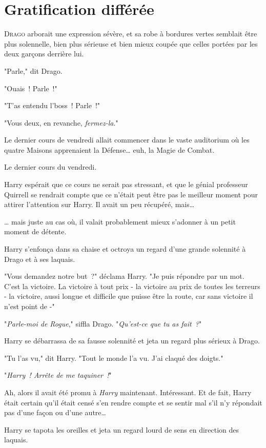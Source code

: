 \chapter{Gratification différée}

\lettrine{D}{rago} arborait une expression sévère, et sa robe à bordures vertes semblait être plus solennelle, bien plus sérieuse et bien mieux coupée que celles portées par les deux garçons derrière lui.

"Parle," dit Drago.

"Ouais~! Parle~!"

"T'as entendu l'boss~! Parle~!"

"Vous deux, en revanche, \emph{fermez-la}."

Le dernier cours de vendredi allait commencer dans le vaste auditorium où les quatre Maisons apprenaient la Défense… euh, la Magie de Combat.

Le dernier cours du vendredi.

Harry espérait que ce cours ne serait pas stressant, et que le génial professeur Quirrell se rendrait compte que ce n'était peut être pas le meilleur moment pour attirer l'attention sur Harry. Il avait un peu récupéré, mais…

… mais juste au cas où, il valait probablement mieux s'adonner à un petit moment de détente.

Harry s'enfonça dans sa chaise et octroya un regard d'une grande solennité à Drago et à ses laquais.

"Vous demandez notre but~?" déclama Harry. "Je puis répondre par un mot. C'est la victoire. La victoire à tout prix - la victoire au prix de toutes les terreurs - la victoire, aussi longue et difficile que puisse être la route, car sans victoire il n'est point de -"

"\emph{Parle-moi de Rogue}," siffla Drago. "\emph{Qu'est-ce que tu as fait~?}"

Harry se débarrassa de sa fausse solennité et jeta un regard plus sérieux à Drago.

"Tu l'as vu," dit Harry. "Tout le monde l'a vu. J'ai claqué des doigts."

"\emph{Harry~! Arrête de me taquiner~!}"

Ah, alors il avait été promu à \emph{Harry} maintenant. Intéressant. Et de fait, Harry était certain qu'il était censé s'en rendre compte et se sentir mal s'il n'y répondait pas d'une façon ou d'une autre…

Harry se tapota les oreilles et jeta un regard lourd de sens en direction des laquais.

